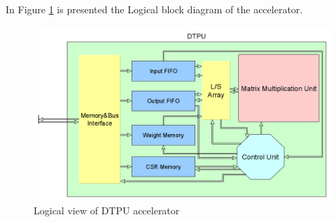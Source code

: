 In Figure \ref{fig:logaccel} is presented the Logical block diagram of the accelerator.
\begin{figure}[!htbp]
\centering
\captionsetup{justification=centering}
\includegraphics[scale=0.3]{./figure/logical_view.png}
\caption{Logical view of DTPU accelerator}
\label{fig:logaccel}
\end{figure}
